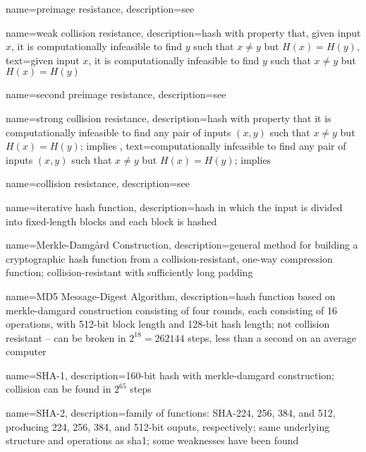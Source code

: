 {
    name={preimage resistance},
    description={see }
}

{
    name={weak collision resistance},
    description={hash with property that, given input $x$, it is computationally infeasible to find $y$ such that $x\neq y$ but $H(x) = H(y)$},
    text={given input $x$, it is computationally infeasible to find $y$ such that $x\neq y$ but $H(x) = H(y)$}
}

{
    name={second preimage resistance},
    description={see }
}

{
    name={strong collision resistance},
    description={hash with property that it is computationally infeasible to find any pair of inputs $(x, y)$ such that $x\neq y$ but $H(x) = H(y)$; implies },
    text={computationally infeasible to find any pair of inputs $(x, y)$ such that $x\neq y$ but $H(x) = H(y)$; implies }
}

{
    name={collision resistance},
    description={see }
}

{
    name={iterative hash function},
    description={hash in which the input is divided into fixed-length blocks and each block is hashed}
}

{
    name={Merkle-Damg\r{a}rd Construction},
    description={general method for building a cryptographic hash function from a collision-resistant, one-way compression function; collision-resistant with sufficiently long padding}
}

{
    name={MD5 Message-Digest Algorithm},
    description={hash function based on \gls{merkle-damgard construction} consisting of four rounds, each consisting of 16 operations, with 512-bit block length and 128-bit hash length; not collision resistant -- can be broken in $2^{18} = 262144$ steps, less than a second on an average computer}
}

{
    name={SHA-1},
    description={160-bit hash with \gls{merkle-damgard construction}; collision can be found in $2^{65}$ steps}
}

{
    name={SHA-2},
    description={family of functions: SHA-224, 256, 384, and 512, producing 224, 256, 384, and 512-bit ouputs, respectively; same underlying structure and operations as \gls{sha1}; some weaknesses have been found}
}

